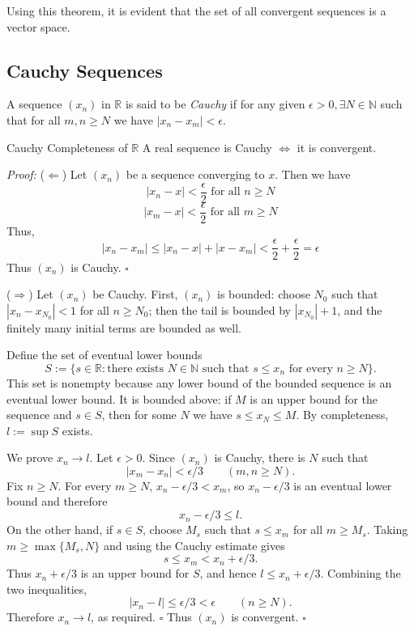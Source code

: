 \documentclass[a4paper,11pt,abstracton]{scrartcl}
\newcommand{\RR}{\mathbb{R}}
\newcommand{\NN}{\mathbb{N}}
\theoremstyle{dotlessP}
\theoremstyle{dotlessS}
\theoremstyle{remark}
\theoremstyle{definition}
\begin{document}
Using this theorem, it is evident that the set of all convergent sequences is a vector space.

\subsection{Cauchy Sequences}
\begin{definition_box}
A sequence $(x_n)$ in $\RR$ is said to be \emph{Cauchy} if for any given
$\epsilon>0, \exists N \in \NN$ such that for all $m,n \ge N$ we have $|x_n-x_m|<\epsilon$.
\end{definition_box}

\begin{mainbox}{Cauchy Completeness of $\RR$}
A real sequence is Cauchy $\iff$ it is convergent.
\end{mainbox}

\begin{claim_box}
\textit{Proof:} ($\Leftarrow$)
Let $(x_n)$ be a sequence converging to $x$.
Then we have 
$$|x_n-x| < \frac{\epsilon}{2} \text{ for all } n \ge N$$
$$|x_m-x| < \frac{\epsilon}{2} \text{ for all } m \ge N$$
Thus,
$$|x_n - x_m| \le |x_n-x| + |x-x_m| < \frac{\epsilon}{2} + \frac{\epsilon}{2} = \epsilon$$
Thus $(x_n)$ is Cauchy.
\hfill$\square$

($\Rightarrow$) Let $(x_n)$ be Cauchy. First, $(x_n)$ is bounded:
choose $N_0$ such that $|x_n-x_{N_0}|<1$ for all $n\ge N_0$;
then the tail is bounded by $|x_{N_0}|+1$, and the finitely many
initial terms are bounded as well.

Define the set of eventual lower bounds
\[
  S:=\{s\in\RR:\text{there exists }N\in\NN\text{ such that }
             s\le x_n\text{ for every }n\ge N\}.
\]
This set is nonempty because any lower bound of the bounded sequence
is an eventual lower bound. It is bounded above: if $M$ is an upper
bound for the sequence and $s\in S$, then for some $N$ we have
$s\le x_N\le M$. By completeness, $l:=\sup S$ exists.

We prove $x_n\to l$. Let $\epsilon>0$. Since $(x_n)$ is Cauchy,
there is $N$ such that
\[
  |x_m-x_n|<\epsilon/3\qquad(m,n\ge N).
\]
Fix $n\ge N$. For every $m\ge N$,
$x_n-\epsilon/3<x_m$, so $x_n-\epsilon/3$ is an eventual lower
bound and therefore
\[
  x_n-\epsilon/3\le l.
\]
On the other hand, if $s\in S$, choose $M_s$ such that
$s\le x_m$ for all $m\ge M_s$. Taking
$m\ge\max\{M_s,N\}$ and using the Cauchy estimate gives
\[
  s\le x_m<x_n+\epsilon/3.
\]
Thus $x_n+\epsilon/3$ is an upper bound for $S$, and hence
$l\le x_n+\epsilon/3$. Combining the two inequalities,
\[
  |x_n-l|\le\epsilon/3<\epsilon\qquad(n\ge N).
\]
Therefore $x_n\to l$, as required.
\hfill$\square$
Thus $(x_n)$ is convergent.
\hfill$\square$
\end{claim_box}
\end{document}
